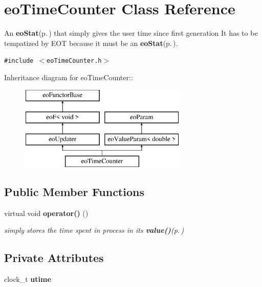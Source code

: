\section{eo\-Time\-Counter Class Reference}
\label{classeo_time_counter}
An {\bf eo\-Stat}{\rm (p.\,\pageref{classeo_stat})} that simply gives the user time since first generation It has to be tempatized by EOT because it must be an {\bf eo\-Stat}{\rm (p.\,\pageref{classeo_stat})}.  


{\tt \#include $<$eo\-Time\-Counter.h$>$}

Inheritance diagram for eo\-Time\-Counter::\begin{figure}[H]
\begin{center}
\leavevmode
\includegraphics[height=4cm]{classeo_time_counter}
\end{center}
\end{figure}
\subsection*{Public Member Functions}
\begin{CompactItemize}
\item 
virtual void {\bf operator()} ()\label{classeo_time_counter_a1}

\begin{CompactList}\small\item\em simply stores the time spent in process in its {\bf value()}{\rm (p.\,\pageref{classeo_value_param_a2})} \item\end{CompactList}\end{CompactItemize}
\subsection*{Private Attributes}
\begin{CompactItemize}
\item 
clock\_\-t {\bf utime}\label{classeo_time_counter_r0}

\end{CompactItemize}


